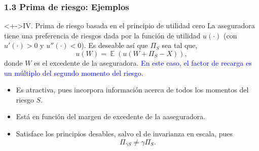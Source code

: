 \documentclass[cjk,t,compress]{beamer}
\newcommand{\field}[1]{\mathbb{#1}}
\newcommand{\expec}{\operatorname{\field{E}}}
\begin{document}
\begin{frame}[fragile]
	\frametitle{1.3 Prima de riesgo: Ejemplos}
	\scriptsize  	
		
		\vspace{0.2cm}
		\begin{block}<+->{IV. Prima de riesgo basada en el principio de utilidad cero}
		\vspace{0.1cm}
		La aseguradora tiene una preferencia de riesgos dada por la funci\'on de utilidad $u(\cdot)$ (con $u'(\cdot)>0$ y $u''(\cdot)<0$). Es deseable as\'i que $\Pi_{S}$ sea tal que, 
		\begin{equation}
			u(W) = \expec\left(u\left(W+\Pi_{S}-X\right)\right),
		\end{equation}
		donde $W$ es el excedente de la aseguradora.
		\newline
		\textcolor{blue}{En este caso, el factor de recarga es un m\'ultiplo del segundo momento del riesgo.}
		
		\begin{itemize}
		  \item Es atractiva, pues incorpora informaci\'on acerca de todos los momentos del riesgo $S$.
		  \item Est\'a en funci\'on del margen de excedente de la aaseguradora.
		  \item Satisface los principios desables, salvo el de invarianza en escala, pues
		  $$\Pi_{\gamma S}\neq \gamma \Pi_{S}.$$
		\end{itemize}
		\end{block}  		

\end{frame}
\end{document}

